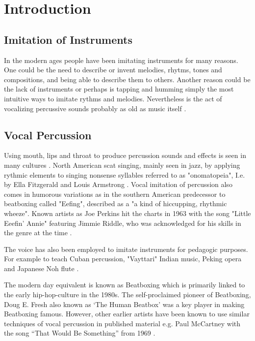 \section{ Introduction }
\subsection{ Imitation of Instruments }
In the modern ages people have been imitating instruments for many reasons. One could be the need to describe or invent melodies, rhytms, tones and compositions, and being able to describe them to others. Another reason could be the lack of instruments or perhaps is tapping and humming simply the most intuitive ways to imitate rythms and melodies. Nevertheless is the act of vocalizing percussive sounds probably as old as music itself \citep{Sinyor05}.
\subsection{ Vocal Percussion }
Using mouth, lips and throat to produce percussion sounds and effects is seen in many cultures \citep{Sinyor05}. North American scat singing, mainly seen in jazz, by applying rythmic elements to singing nonsense syllables referred to as "onomatopeia", I.e. by Ella Fitzgerald and Louis Armstrong \citep{Janer_syllablingon}. Vocal imitation of percussion also comes in humorous variations as in the southern American predecessor to beatboxing called "Eefing", described as a "a kind of hiccupping, rhythmic wheeze". Known artists as Joe Perkins hit the charts in 1963 with the song "Little Eeefin' Annie" featuring Jimmie Riddle, who was acknowledged for his skills in the genre at the time \citep{jennifersharpe2006}.

 The voice has also been employed to imitate instruments for pedagogic purposes. For example to teach Cuban percussion, "Vayttari" Indian music, Peking opera and Japanese Noh flute \citep{Janer_syllablingon}.

The modern day equivalent is known as Beatboxing which is primarily linked to the early hip-hop-culture in the 1980s. The self-proclaimed pioneer of Beatboxing, Doug E. Fresh also known as ‘The Human Beatbox’ was a key player in making Beatboxing famous. However, other earlier artists have been known to use similar techniques of vocal percussion in published material e.g. Paul McCartney with the song “That Would Be Something” from 1969 \citep{Sinyor05}.
